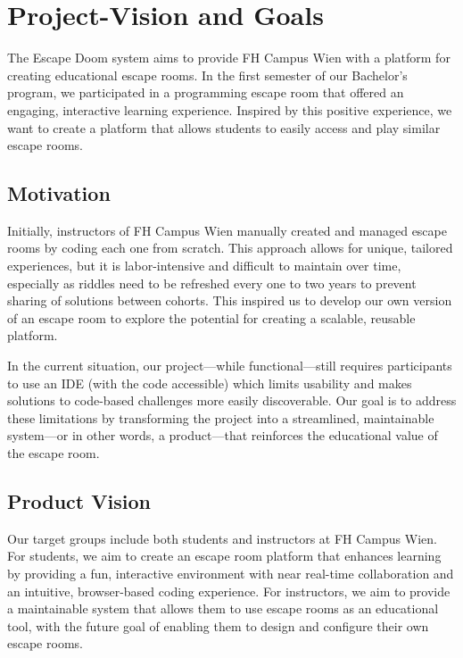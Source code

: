 \hypertarget{section-introduction-and-goals}{%
\section{Project-Vision and Goals}\label{section:introduction-and-goals}}

The Escape Doom system aims to provide FH Campus Wien with a platform for creating educational escape rooms. In the first semester of our Bachelor’s program, we participated in a programming escape room that offered an engaging, interactive learning experience. Inspired by this positive experience, we want to create a platform that allows students to easily access and play similar escape rooms.


\subsection{Motivation}

Initially, instructors of FH Campus Wien manually created and managed escape rooms by coding each one from scratch. This approach allows for unique, tailored experiences, but it is labor-intensive and difficult to maintain over time, especially as riddles need to be refreshed every one to two years to prevent sharing of solutions between cohorts. This inspired us to develop our own version of an escape room to explore the potential for creating a scalable, reusable platform.

In the current situation, our project—while functional—still requires participants to use an IDE (with the code accessible) which limits usability and makes solutions to code-based challenges more easily discoverable. Our goal is to address these limitations by transforming the project into a streamlined, maintainable system—or in other words, a product—that reinforces the educational value of the escape room.

\subsection{Product Vision}

Our target groups include both students and instructors at FH Campus Wien. For students, we aim to create an escape room platform that enhances learning by providing a fun, interactive environment with near real-time collaboration and an intuitive, browser-based coding experience. For instructors, we aim to provide a maintainable system that allows them to use escape rooms as an educational tool, with the future goal of enabling them to design and configure their own escape rooms.


